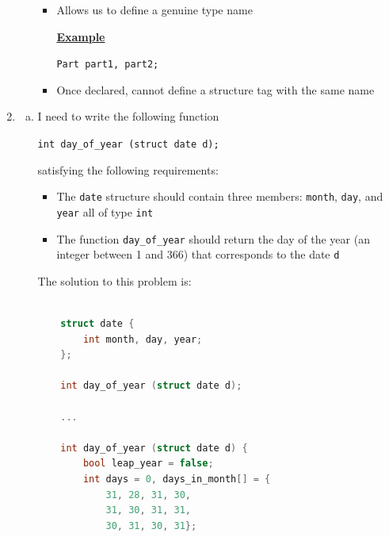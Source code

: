 \documentclass[12pt]{article}
\begin{document}
\begin{enumerate}[1.]
\begin{itemize}
\begin{itemize}
            \item Allows us to define a genuine type name

            \bigskip

            \underline{\textbf{Example}}

            \bigskip

            \texttt{Part part1, part2;}
            \item Once declared, cannot define a structure tag with the same name
        \end{itemize}
    \end{itemize}

    \item

    \begin{enumerate}[a)]
        \item

        I need to write the following function

        \bigskip

        \texttt{int day\_of\_year (struct date d);}

        \bigskip

        satisfying the following requirements:

        \begin{itemize}
            \item The \texttt{date} structure should contain three members: \texttt{month},
            \texttt{day}, and \texttt{year} all of type \texttt{int}

            \item The function \texttt{day\_of\_year} should return the day of the year (an integer between 1 and 366)
            that corresponds to the date \texttt{d}
        \end{itemize}

        \bigskip

        The solution to this problem is:

        \bigskip

\begin{lstlisting}[language=c]

    struct date {
        int month, day, year;
    };

    int day_of_year (struct date d);

    ...

    int day_of_year (struct date d) {
        bool leap_year = false;
        int days = 0, days_in_month[] = {
            31, 28, 31, 30,
            31, 30, 31, 31,
            30, 31, 30, 31};


\end{lstlisting}
\end{enumerate}
\end{enumerate}
\end{document}
